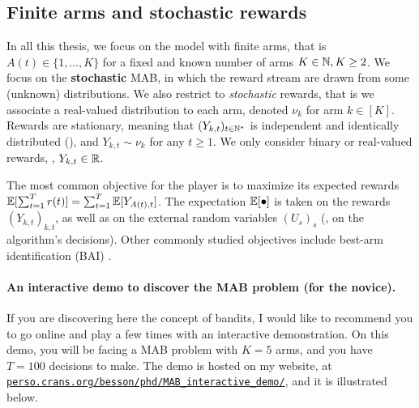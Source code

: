 \subsection{Finite arms and stochastic rewards}

In all this thesis, we focus on the model with finite arms, that is $A(t)\in\{1,\dots,K\}$ for a fixed and known number of arms $K\in\mathbb{N},K\geq2$.
%
We focus on the \textbf{stochastic} MAB, in which the reward stream are drawn from some (unknown) distributions.
%
%
We also restrict to \emph{stochastic} rewards, that is we associate a real-valued distribution to each arm, denoted $\nu_k$ for arm $k\in[K]$.
Rewards are stationary, meaning that $(Y_{k,t})_{t\in\mathbb{N}^*}$ is independent and identically distributed (\iid), and $Y_{k,t} \sim \nu_k$ for any $t\geq1$.
We only consider binary or real-valued rewards, \ie, $Y_{k,t}\in\mathbb{R}$.

The most common objective for the player is to maximize its expected rewards $\mathbb{E}[\sum_{t=1}^T r(t)] = \sum_{t=1}^T \mathbb{E}[Y_{A(t),t}]$.
The expectation $\mathbb{E}[\bullet]$ is taken on the rewards $(Y_{k,t})_{k,t}$, as well as on the external random variables $(U_s)_s$ (\ie, on the algorithm's decisions).
%
Other commonly studied objectives include best-arm identification (BAI) \cite{audibert2010best}.


\paragraph{An interactive demo to discover the MAB problem (for the novice).}
\label{par:2:interactiveDemoDiscoverMAB}
%
If you are discovering here the concept of bandits, I would like to recommend you to go online and play a few times with an interactive demonstration.
On this demo, you will be facing a MAB problem with $K=5$ arms, and you have $T=100$ decisions to make.
The demo is hosted on my website, at \href{https://perso.crans.org/besson/phd/MAB\_interactive\_demo/}{\texttt{perso.crans.org/besson/phd/MAB\_interactive\_demo/}}, and it is illustrated below.

